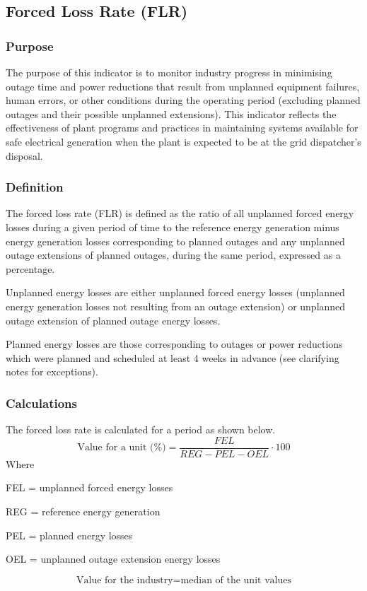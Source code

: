 \subsection{Forced Loss Rate (FLR)}

\subsubsection{Purpose}

The purpose of this indicator is to monitor industry progress in
minimising outage time and power reductions that result from unplanned
equipment failures, human errors, or other conditions during the
operating period (excluding planned outages and their possible
unplanned extensions). This indicator reflects the effectiveness of
plant programs and practices in maintaining systems available for safe
electrical generation when the plant is expected to be at the grid
dispatcher’s disposal.

\subsubsection{Definition}

The forced loss rate (FLR) is defined as the ratio of all unplanned
forced energy losses during a given period of time to the reference
energy generation minus energy generation losses corresponding to
planned outages and any unplanned outage extensions of planned
outages, during the same period, expressed as a percentage. 

Unplanned energy losses are either unplanned forced energy losses
(unplanned energy generation losses not resulting from an outage
extension) or unplanned outage extension of planned outage energy
losses. 

Planned energy losses are those corresponding to outages or power
reductions which were planned and scheduled at least 4 weeks in
advance (see clarifying notes for exceptions).

\subsubsection{Calculations}

The forced loss rate is calculated for a period as shown below.
$$ \text{Value for a unit (\%)} = \frac{FEL}{REG-PEL-OEL} \cdot 100 $$		
Where	

FEL =	unplanned forced energy losses

REG =	reference energy generation 

PEL =	planned energy losses 

 OEL =	 unplanned outage extension energy losses

$$ \text{Value for the industry} = \text{median of the unit values} $$